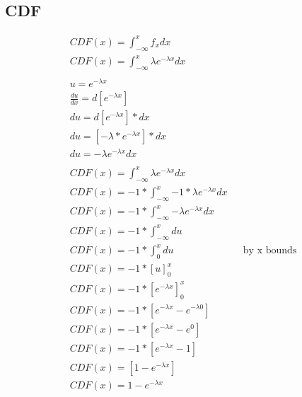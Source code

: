 \documentclass[]{article}
\begin{document}
\subsection{CDF}
\begin{align*}
	CDF(x) = \int_{-\infty}^{x} {f_xdx}\\
	CDF(x) = \int_{-\infty}^{x} {\lambda e^{-\lambda x}dx}\\
	\\
	u = e^{-\lambda x}\\
	\frac{du}{dx} = d[e^{-\lambda x}]\\
	du = d[e^{-\lambda x}]*dx\\
	du = [-\lambda * e^{-\lambda x}]*dx\\
	du = -\lambda e^{-\lambda x}dx\\
	\\
	CDF(x) = \int_{-\infty}^{x} {\lambda e^{-\lambda x}dx}\\
	CDF(x) = -1*\int_{-\infty}^{x} {-1*\lambda e^{-\lambda x}dx}\\
	CDF(x) = -1*\int_{-\infty}^{x} {-\lambda e^{-\lambda x}dx}\\
	CDF(x) = -1*\int_{-\infty}^{x} {du}\\
	CDF(x) = -1*\int_{0}^{x} {du} && \text{by x bounds}\\
	CDF(x) = -1*[u]_{0}^{x}\\
	CDF(x) = -1*[e^{-\lambda x}]_{0}^{x}\\
	CDF(x) = -1*[e^{-\lambda x} - e^{-\lambda 0}]\\
	CDF(x) = -1*[e^{-\lambda x} - e^{0}]\\
	CDF(x) = -1*[e^{-\lambda x} - 1]\\
	CDF(x) = [1 - e^{-\lambda x}]\\
	CDF(x) = 1 - e^{-\lambda x}\\
\end{align*}
\end{document}
